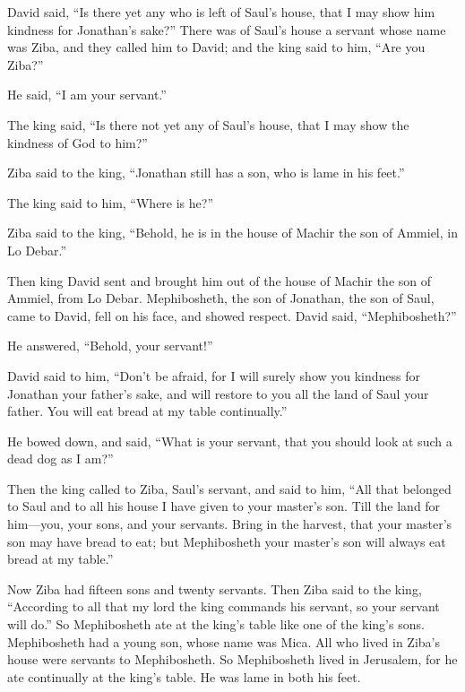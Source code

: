  David said, ``Is there yet any who is left of Saul's house,
that I may show him kindness for Jonathan's sake?''  There
was of Saul's house a servant whose name was Ziba, and they called him
to David; and the king said to him, ``Are you Ziba?''

He said, ``I am your servant.''

 The king said, ``Is there not yet any of Saul's house, that
I may show the kindness of God to him?''

Ziba said to the king, ``Jonathan still has a son, who is lame in his
feet.''

 The king said to him, ``Where is he?''

Ziba said to the king, ``Behold, he is in the house of Machir the son of
Ammiel, in Lo Debar.''

 Then king David sent and brought him out of the house of
Machir the son of Ammiel, from Lo Debar.  Mephibosheth, the
son of Jonathan, the son of Saul, came to David, fell on his face, and
showed respect. David said, ``Mephibosheth?''

He answered, ``Behold, your servant!''

 David said to him, ``Don't be afraid, for I will surely
show you kindness for Jonathan your father's sake, and will restore to
you all the land of Saul your father. You will eat bread at my table
continually.''

 He bowed down, and said, ``What is your servant, that you
should look at such a dead dog as I am?''

 Then the king called to Ziba, Saul's servant, and said to
him, ``All that belonged to Saul and to all his house I have given to
your master's son.  Till the land for him---you, your sons,
and your servants. Bring in the harvest, that your master's son may have
bread to eat; but Mephibosheth your master's son will always eat bread
at my table.''

Now Ziba had fifteen sons and twenty servants.  Then Ziba
said to the king, ``According to all that my lord the king commands his
servant, so your servant will do.'' So Mephibosheth ate at the king's
table like one of the king's sons.  Mephibosheth had a
young son, whose name was Mica. All who lived in Ziba's house were
servants to Mephibosheth.  So Mephibosheth lived in
Jerusalem, for he ate continually at the king's table. He was lame in
both his feet.

